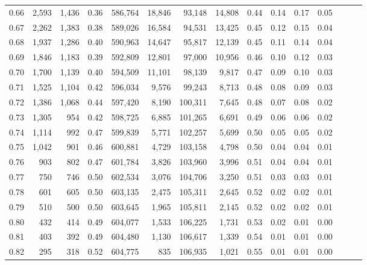 \begin{tabular}{rrrrrrrrrrrrrrr}
0.66 &   2,593 &  1,436 &  0.36 &  586,764 &   18,846 &   93,148 &   14,808 &  0.44 &  0.14 &  0.17 &      0.05 \\
0.67 &   2,262 &  1,383 &  0.38 &  589,026 &   16,584 &   94,531 &   13,425 &  0.45 &  0.12 &  0.15 &      0.04 \\
0.68 &   1,937 &  1,286 &  0.40 &  590,963 &   14,647 &   95,817 &   12,139 &  0.45 &  0.11 &  0.14 &      0.04 \\
0.69 &   1,846 &  1,183 &  0.39 &  592,809 &   12,801 &   97,000 &   10,956 &  0.46 &  0.10 &  0.12 &      0.03 \\
0.70 &   1,700 &  1,139 &  0.40 &  594,509 &   11,101 &   98,139 &    9,817 &  0.47 &  0.09 &  0.10 &      0.03 \\
0.71 &   1,525 &  1,104 &  0.42 &  596,034 &    9,576 &   99,243 &    8,713 &  0.48 &  0.08 &  0.09 &      0.03 \\
0.72 &   1,386 &  1,068 &  0.44 &  597,420 &    8,190 &  100,311 &    7,645 &  0.48 &  0.07 &  0.08 &      0.02 \\
0.73 &   1,305 &    954 &  0.42 &  598,725 &    6,885 &  101,265 &    6,691 &  0.49 &  0.06 &  0.06 &      0.02 \\
0.74 &   1,114 &    992 &  0.47 &  599,839 &    5,771 &  102,257 &    5,699 &  0.50 &  0.05 &  0.05 &      0.02 \\
0.75 &   1,042 &    901 &  0.46 &  600,881 &    4,729 &  103,158 &    4,798 &  0.50 &  0.04 &  0.04 &      0.01 \\
0.76 &     903 &    802 &  0.47 &  601,784 &    3,826 &  103,960 &    3,996 &  0.51 &  0.04 &  0.04 &      0.01 \\
0.77 &     750 &    746 &  0.50 &  602,534 &    3,076 &  104,706 &    3,250 &  0.51 &  0.03 &  0.03 &      0.01 \\
0.78 &     601 &    605 &  0.50 &  603,135 &    2,475 &  105,311 &    2,645 &  0.52 &  0.02 &  0.02 &      0.01 \\
0.79 &     510 &    500 &  0.50 &  603,645 &    1,965 &  105,811 &    2,145 &  0.52 &  0.02 &  0.02 &      0.01 \\
0.80 &     432 &    414 &  0.49 &  604,077 &    1,533 &  106,225 &    1,731 &  0.53 &  0.02 &  0.01 &      0.00 \\
0.81 &     403 &    392 &  0.49 &  604,480 &    1,130 &  106,617 &    1,339 &  0.54 &  0.01 &  0.01 &      0.00 \\
0.82 &     295 &    318 &  0.52 &  604,775 &      835 &  106,935 &    1,021 &  0.55 &  0.01 &  0.01 &      0.00 \\

\end{tabular}
